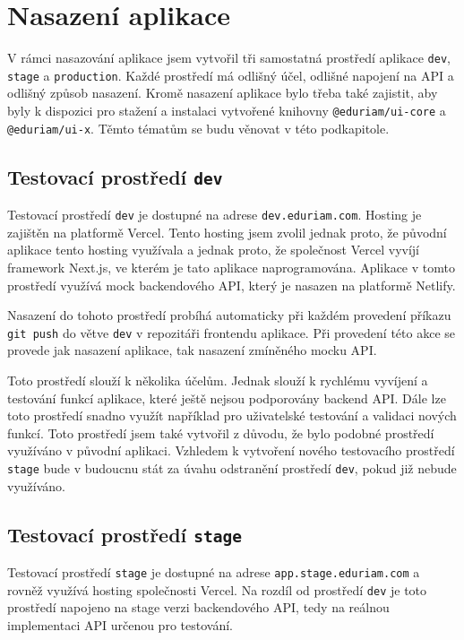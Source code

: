 \section{Nasazení aplikace}\label{sec:deployment}

V rámci nasazování aplikace jsem vytvořil tři samostatná prostředí aplikace \texttt{dev}, \texttt{stage} a \texttt{production}. Každé prostředí má odlišný účel, odlišné napojení na API a odlišný způsob nasazení. Kromě nasazení aplikace bylo třeba také zajistit, aby byly k dispozici pro stažení a instalaci vytvořené knihovny \texttt{@eduriam/ui-core} a \texttt{@eduriam/ui-x}. Těmto tématům se budu věnovat v této podkapitole.

\subsection{Testovací prostředí \texttt{dev}}

Testovací prostředí \texttt{dev} je dostupné na adrese \texttt{dev.eduriam.com}. Hosting je zajištěn na platformě Vercel. Tento hosting jsem zvolil jednak proto, že původní aplikace tento hosting využívala a jednak proto, že společnost Vercel vyvíjí framework Next.js, ve kterém je tato aplikace naprogramována. Aplikace v tomto prostředí využívá mock backendového API, který je nasazen na platformě Netlify.

Nasazení do tohoto prostředí probíhá automaticky při každém provedení příkazu \texttt{git push} do větve \texttt{dev} v repozitáři frontendu aplikace. Při provedení této akce se provede jak nasazení aplikace, tak nasazení zmíněného mocku API.

Toto prostředí slouží k několika účelům. Jednak slouží k rychlému vyvíjení a testování funkcí aplikace, které ještě nejsou podporovány backend API. Dále lze toto prostředí snadno využít například pro uživatelské testování a validaci nových funkcí. Toto prostředí jsem také vytvořil z důvodu, že bylo podobné prostředí využíváno v původní aplikaci. Vzhledem k vytvoření nového testovacího prostředí \texttt{stage} bude v budoucnu stát za úvahu odstranění prostředí \texttt{dev}, pokud již nebude využíváno.

\subsection{Testovací prostředí \texttt{stage}}

Testovací prostředí \texttt{stage} je dostupné na adrese \texttt{app.stage.eduriam.com} a rovněž využívá hosting společnosti Vercel. Na rozdíl od prostředí \texttt{dev} je toto prostředí napojeno na stage verzi backendového API, tedy na reálnou implementaci API určenou pro testování.

